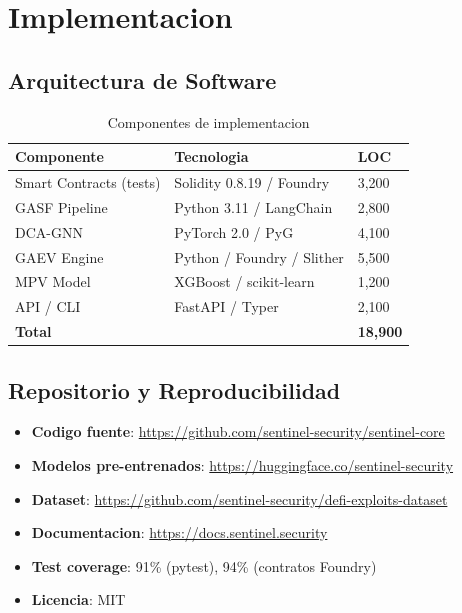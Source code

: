 \documentclass[11pt]{article}
\theoremstyle{definition}
\theoremstyle{plain}
\theoremstyle{remark}
\begin{document}
\section{Implementacion}
\label{sec:implementacion}

\subsection{Arquitectura de Software}

\begin{table}[H]
\centering
\caption{Componentes de implementacion}
\label{tab:implementation}
\begin{tabular}{lll}
\toprule
\textbf{Componente} & \textbf{Tecnologia} & \textbf{LOC} \\
\midrule
Smart Contracts (tests) & Solidity 0.8.19 / Foundry & 3,200 \\
GASF Pipeline & Python 3.11 / LangChain & 2,800 \\
DCA-GNN & PyTorch 2.0 / PyG~\cite{fey2019fast} & 4,100 \\
GAEV Engine & Python / Foundry / Slither & 5,500 \\
MPV Model & XGBoost / scikit-learn & 1,200 \\
API / CLI & FastAPI / Typer & 2,100 \\
\midrule
\textbf{Total} & & \textbf{18,900} \\
\bottomrule
\end{tabular}
\end{table}

\subsection{Repositorio y Reproducibilidad}

\begin{itemize}
    \item \textbf{Codigo fuente}: \url{https://github.com/sentinel-security/sentinel-core}
    \item \textbf{Modelos pre-entrenados}: \url{https://huggingface.co/sentinel-security}
    \item \textbf{Dataset}: \url{https://github.com/sentinel-security/defi-exploits-dataset}
    \item \textbf{Documentacion}: \url{https://docs.sentinel.security}
    \item \textbf{Test coverage}: 91\% (pytest), 94\% (contratos Foundry)
    \item \textbf{Licencia}: MIT
\end{itemize}
\end{document}
